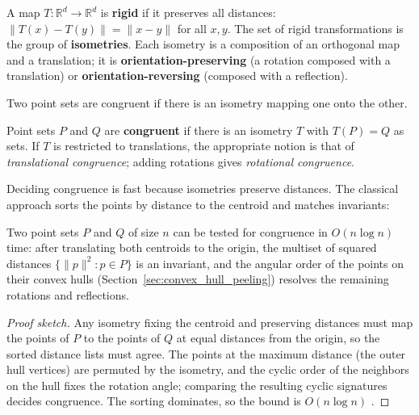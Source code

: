 \begin{definition}\label{def:match_isometry}
  A map $T \colon \mathbb{R}^d \to \mathbb{R}^d$ is \textbf{rigid} if it
  preserves all distances: $\|T(x) - T(y)\| = \|x - y\|$ for all $x, y$. The
  set of rigid transformations is the group of \textbf{isometries}. Each
  isometry is a composition of an orthogonal map and a translation; it is
  \textbf{orientation-preserving} (a rotation composed with a translation)
  or \textbf{orientation-reversing} (composed with a reflection).
\end{definition}

Two point sets are congruent if there is an isometry mapping one onto the
other.

\begin{definition}[Congruence]\label{def:match_congruence}
  Point sets $P$ and $Q$ are \textbf{congruent} if there is an isometry $T$
  with $T(P) = Q$ as sets. If $T$ is restricted to translations, the
  appropriate notion is that of \emph{translational congruence}; adding
  rotations gives \emph{rotational congruence}.
\end{definition}

Deciding congruence is fast because
isometries preserve distances. The classical approach sorts the points by
distance to the centroid and matches invariants:

\begin{theorem}\label{thm:match_congruence_test}
  Two point sets $P$ and $Q$ of size $n$ can be tested for congruence in
  $O(n \log n)$ time: after translating both centroids to the origin, the
  multiset of squared distances $\{\|p\|^2 : p \in P\}$ is an invariant, and
  the angular order of the points on their convex hulls
  (Section~\ref{sec:convex_hull_peeling}) resolves the remaining rotations
  and reflections.
\end{theorem}

\begin{proof}[Proof sketch]
  Any isometry fixing the centroid and preserving distances must map the
  points of $P$ to the points of $Q$ at equal distances from the origin, so
  the sorted distance lists must agree. The points at the maximum distance
  (the outer hull vertices) are permuted by the isometry, and the cyclic
  order of the neighbors on the hull fixes the rotation angle; comparing the
  resulting cyclic signatures decides congruence. The sorting dominates, so
  the bound is $O(n \log n)$ \cite{atallah1985symmetry,highnam1986}.
\end{proof}

